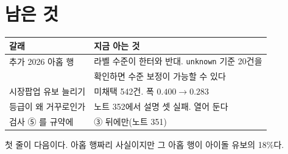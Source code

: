\documentclass[11pt]{article}
\begin{document}
\section{남은 것}

\begin{center}
\begin{tabular}{ll}
\hline
갈래 & 지금 아는 것 \\
\hline
추가 2026 아홉 행 & 라벨 수준이 한터와 반대. \texttt{unknown} 기준 20건을 \\
                  & 확인하면 수준 보정이 가능할 수 있다 \\
시장팝업 유보 늘리기 & 미채택 542건. 폭 $0.400\to0.283$ \\
등급이 왜 거꾸로인가 & 노트 352에서 설명 셋 실패. 열어 둔다 \\
검사 ⑤ 를 규약에 & ③ 뒤에만(노트 351) \\
\hline
\end{tabular}
\end{center}

첫 줄이 다음이다. 아홉 행짜리 사실이지만 그 아홉 행이 아이돌 유보의
18\%다.
\end{document}
